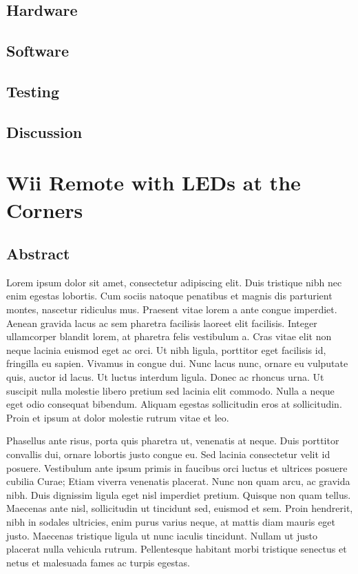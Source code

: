 \documentclass[12pt]{report}	%
\begin{document}
\section{Hardware}
\section{Software}
\section{Testing}
\section{Discussion}
	
\chapter{Wii Remote with LEDs at the Corners}
\section{Abstract}
Lorem ipsum dolor sit amet, consectetur adipiscing elit. Duis tristique
nibh nec enim egestas lobortis. Cum sociis natoque penatibus et magnis
dis parturient montes, nascetur ridiculus mus. Praesent vitae lorem a
ante congue imperdiet. Aenean gravida lacus ac sem pharetra facilisis
laoreet elit facilisis. Integer ullamcorper blandit lorem, at pharetra
felis vestibulum a. Cras vitae elit non neque lacinia euismod eget ac
orci. Ut nibh ligula, porttitor eget facilisis id, fringilla eu
sapien. Vivamus in congue dui. Nunc lacus nunc, ornare eu vulputate
quis, auctor id lacus. Ut luctus interdum ligula. Donec ac rhoncus
urna. Ut suscipit nulla molestie libero pretium sed lacinia elit
commodo. Nulla a neque eget odio consequat bibendum. Aliquam egestas
sollicitudin eros at sollicitudin. Proin et ipsum at dolor molestie
rutrum vitae et leo.

Phasellus ante risus, porta quis pharetra ut, venenatis at neque. Duis
porttitor convallis dui, ornare lobortis justo congue eu. Sed lacinia
consectetur velit id posuere. Vestibulum ante ipsum primis in faucibus
orci luctus et ultrices posuere cubilia Curae; Etiam viverra venenatis
placerat. Nunc non quam arcu, ac gravida nibh. Duis dignissim ligula
eget nisl imperdiet pretium. Quisque non quam tellus. Maecenas ante
nisl, sollicitudin ut tincidunt sed, euismod et sem. Proin hendrerit,
nibh in sodales ultricies, enim purus varius neque, at mattis diam
mauris eget justo. Maecenas tristique ligula ut nunc iaculis
tincidunt. Nullam ut justo placerat nulla vehicula rutrum. Pellentesque
habitant morbi tristique senectus et netus et malesuada fames ac turpis
egestas.
\end{document}
